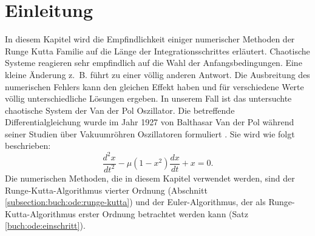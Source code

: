 %
%
%
\section{Einleitung\label{vanderpol:section:einleitung}}
In diesem Kapitel wird die Empfindlichkeit einiger numerischer Methoden der Runge Kutta Familie auf die Länge der Integrationsschrittes erläutert.
Chaotische Systeme reagieren sehr empfindlich auf die Wahl der Anfangsbedingungen. Eine kleine Änderung z.~B. führt zu einer völlig anderen Antwort.
Die Ausbreitung des numerischen Fehlers kann den gleichen Effekt haben und für verschiedene Werte völlig unterschiedliche Lösungen ergeben.
In unserem Fall ist das untersuchte chaotische System der Van der Pol Oszillator.
Die betreffende Differentialgleichung wurde im Jahr 1927 von Balthasar Van der Pol während seiner Studien über Vakuumröhren Oszillatoren formuliert \cite{vanderpol:bibvdp}.
Sie wird wie folgt beschrieben:
\begin{equation}
\frac{d^{2}x}{dt^{2}} - \mu (1 - x^{2}) \frac{dx}{dt} + x = 0.
\label{vanderpol:equations:vdp}
\end{equation}
Die numerischen Methoden, die in diesem Kapitel verwendet werden, sind der Runge-Kutta-Algorithmus vierter Ordnung (Abschnitt \ref{subsection:buch:ode:runge-kutta}) und der Euler-Algorithmus, der als Runge-Kutta-Algorithmus erster Ordnung betrachtet werden kann (Satz \ref{buch:ode:einschritt}).
